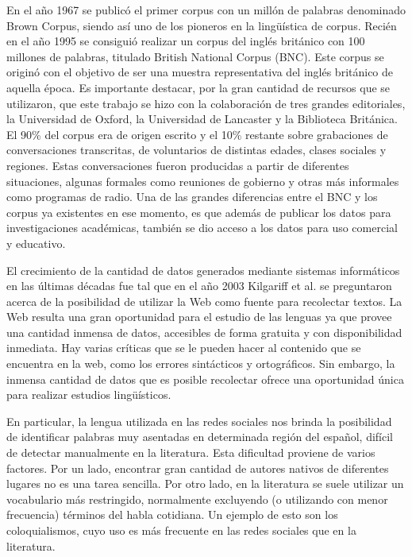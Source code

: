 En el año 1967 se publicó el primer corpus con un millón de palabras denominado Brown Corpus, siendo así uno de los pioneros en la lingüística de corpus. Recién en el año 1995 se consiguió realizar un corpus del inglés británico con 100 millones de palabras, titulado British National Corpus (BNC). 
Este corpus se originó con el objetivo de ser una muestra representativa del inglés británico de aquella época. 
Es importante destacar, por la gran cantidad de recursos que se utilizaron, que este trabajo se hizo con la colaboración de tres grandes editoriales, la Universidad de Oxford, la Universidad de Lancaster y la Biblioteca Británica. 
El 90\% del corpus era de origen escrito y el 10\% restante sobre grabaciones de conversaciones transcritas, de voluntarios de distintas edades, clases sociales y regiones. 
Estas conversaciones fueron producidas a partir de diferentes situaciones, algunas formales como reuniones de gobierno y otras más informales como programas de radio. 
Una de las grandes diferencias entre el BNC y los corpus ya existentes en ese momento, es que además de publicar los datos para investigaciones académicas, también se dio acceso a los datos para uso comercial y educativo.

El crecimiento de la cantidad de datos generados mediante sistemas informáticos en las últimas décadas fue tal que en el año 2003 Kilgariff et al. \cite{kilgarriff2003introduction} se preguntaron acerca de la posibilidad de utilizar la Web como fuente para recolectar textos.
La Web resulta una gran oportunidad para el estudio de las lenguas ya que provee una cantidad inmensa de datos, accesibles de forma gratuita y con disponibilidad inmediata. Hay varias críticas que se le pueden hacer al contenido que se encuentra en la web, como los errores sintácticos y ortográficos. Sin embargo, la inmensa cantidad de datos que es posible recolectar ofrece una oportunidad única para realizar estudios lingüísticos.

En particular, la lengua utilizada en las redes sociales nos brinda la posibilidad de identificar palabras muy asentadas en determinada región del español, difícil de detectar manualmente en la literatura. Esta dificultad proviene de varios factores. Por un lado, encontrar gran cantidad de autores nativos de diferentes lugares no es una tarea sencilla. Por otro lado, en la literatura se suele utilizar un vocabulario más restringido, normalmente excluyendo (o utilizando con menor frecuencia) términos del habla cotidiana. Un ejemplo de esto son los coloquialismos, cuyo uso es más frecuente en las redes sociales que en la literatura. 

